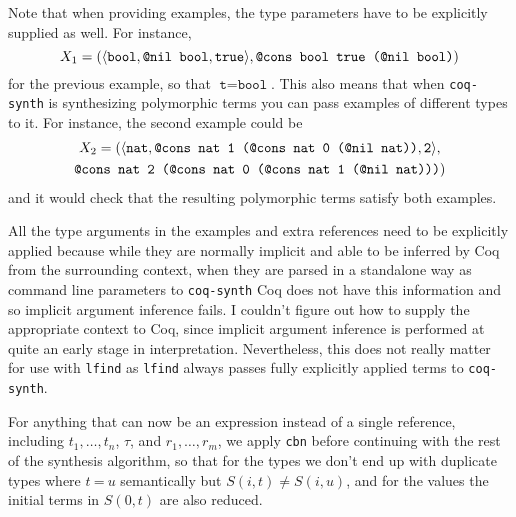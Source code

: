 \documentclass[11pt]{article}
\newcommand{\coq}[1]{\texttt{#1}}
\DeclarePairedDelimiter{\vect}{\langle}{\rangle}
\begin{document}
Note that when providing examples, the type parameters have to be explicitly supplied as well. For instance,
\[X_1 = (\vect{\coq{bool}, \coq{@nil bool}, \coq{true}}, \coq{@cons bool true (@nil bool)})\]
for the previous example, so that $\coq{t} = \coq{bool}$. This also means that when \texttt{coq-synth} is synthesizing polymorphic terms you can pass examples of different types to it. For instance, the second example could be
\begin{multline*}
    X_2 = (\vect{\coq{nat}, \coq{@cons nat 1 (@cons nat 0 (@nil nat))}, \coq{2}}, \\
    \coq{@cons nat 2 (@cons nat 0 (@cons nat 1 (@nil nat)))})
\end{multline*}
and it would check that the resulting polymorphic terms satisfy both examples.

All the type arguments in the examples and extra references need to be explicitly applied because while they are normally implicit and able to be inferred by Coq from the surrounding context, when they are parsed in a standalone way as command line parameters to \texttt{coq-synth} Coq does not have this information and so implicit argument inference fails. I couldn't figure out how to supply the appropriate context to Coq, since implicit argument inference is performed at quite an early stage in interpretation. Nevertheless, this does not really matter for use with \texttt{lfind} as \texttt{lfind} always passes fully explicitly applied terms to \texttt{coq-synth}.

For anything that can now be an expression instead of a single reference, including $t_1, \dots, t_n$, $\tau$, and $r_1, \dots, r_m$, we apply \coq{cbn} before continuing with the rest of the synthesis algorithm, so that for the types we don't end up with duplicate types where $t\ \coq{=}\ u$ semantically but $S(i, t) \neq S(i, u)$, and for the values the initial terms in $S(0, t)$ are also reduced.
\end{document}
